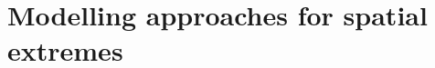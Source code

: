 \documentclass[12pt]{article}
\begin{document}

\section{Modelling approaches for spatial extremes}
\label{sec:modelling}


\end{document}
